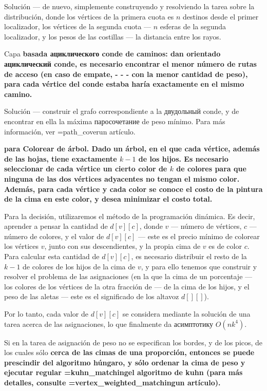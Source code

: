 {Solución --- de nuevo, simplemente construyendo y resolviendo la tarea sobre la distribución, donde los vértices de la primera cuota es $n$ destinos desde el primer localizador, los vértices de la segunda cuota --- $n$ esferas de la segunda localizador, y los pesos de las costillas --- la distancia entre los rayos.

\li Capa \bf{basada ациклического conde de caminos}: dan orientado ациклический conde, es necesario encontrar el menor número de rutas de acceso (en caso de empate, - - - con la menor cantidad de peso), para cada vértice del conde estaba haría exactamente en el mismo camino.

Solución --- construir el grafo correspondiente a la двудольный conde, y de encontrar en ella la máxima паросочетание de peso mínimo. Para más información, ver \algohref=path_cover{un artículo}.

\li \bf{para Colorear de árbol}. Dado un árbol, en el que cada vértice, además de las hojas, tiene exactamente $k-1$ de los hijos. Es necesario seleccionar de cada vértice un cierto color de $k$ de colores para que ninguna de las dos vértices adyacentes no tengan el mismo color. Además, para cada vértice y cada color se conoce el costo de la pintura de la cima en este color, y desea minimizar el costo total.

Para la decisión, utilizaremos el método de la programación dinámica. Es decir, aprender a pensar la cantidad de $d[v][c]$, donde $v$ --- número de vértices, $c$ --- número de colores, y el valor de $d[v][c]$ --- este es el precio mínimo de colorear los vértices $v$, junto con sus descendientes, y la propia cima de $v$ es de color $c$. Para calcular esta cantidad de $d[v][c]$, es necesario distribuir el resto de la $k-1$ de colores de los hijos de la cima de $v$, y para ello tenemos que construir y resolver el problema de las asignaciones (en la que la cima de un porcentaje --- los colores de los vértices de la otra fracción de --- de la cima de los hijos, y el peso de las aletas --- este es el significado de los altavoz $d[][]$).

Por lo tanto, cada valor de $d[v][c]$ se considera mediante la solución de una tarea acerca de las asignaciones, lo que finalmente da асимптотику $O(n k^4)$.

\li Si en la tarea de asignación de peso no se especifican los bordes, y de los picos, de los cuales sólo \bf{cerca de las cimas de una proporción}, entonces se puede prescindir del algoritmo húngaro, y sólo ordenar la cima de peso y ejecutar regular \algohref=kuhn_matching{el algoritmo de kuhn} (para más detalles, consulte \algohref=vertex_weighted_matching{un artículo}).

}
